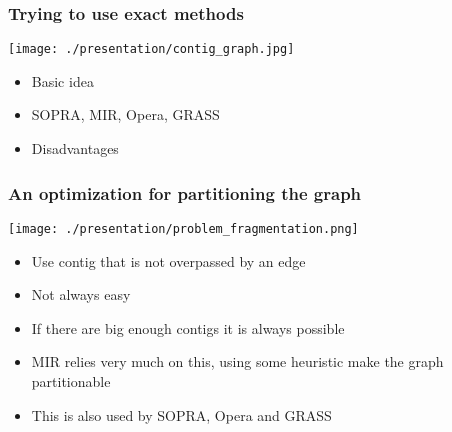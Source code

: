 \documentclass[compress]{beamer}
\begin{document}
  \begin{frame}
    \frametitle{Trying to use exact methods}
    \begin{multicols}{2}
      \vfill
      \begin{minipage}[c][0.8\textheight][c]{\columnwidth}
        {\texttt{[image: ./presentation/contig\_graph.jpg]}}
      \end{minipage}
      \vfill
      \columnbreak
      \begin{minipage}[c][0.8\textheight][c]{\columnwidth}
        \begin{itemize}
          \item Basic idea
          \item SOPRA, MIR, Opera, GRASS
          \item Disadvantages
        \end{itemize}
      \end{minipage}
    \end{multicols}
  \end{frame}

  \begin{frame}
    \frametitle{An optimization for partitioning the graph}
    \begin{multicols}{2}
      \vfill
      \begin{minipage}[c][0.8\textheight][c]{\columnwidth}
        {\texttt{[image: ./presentation/problem\_fragmentation.png]}}
      \end{minipage}
      \vfill
      \columnbreak
      \begin{minipage}[c][0.8\textheight][c]{\columnwidth}
        \begin{itemize}
          \item Use contig that is not overpassed by an edge
          \item Not always easy
          \item If there are big enough contigs it is always possible
          \item MIR relies very much on this, using some heuristic make the
            graph partitionable
          \item This is also used by SOPRA, Opera and GRASS
        \end{itemize}
      \end{minipage}
    \end{multicols}
  \end{frame}
\end{document}
